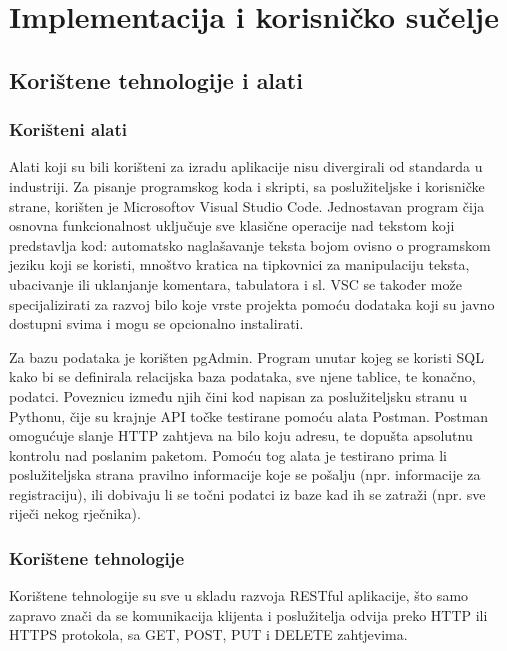 \chapter{Implementacija i korisničko sučelje}
		
		
		\section{Korištene tehnologije i alati}

             \subsection{Korišteni alati}
                \par    Alati koji su bili korišteni za izradu aplikacije nisu divergirali od standarda u industriji. Za pisanje
                programskog koda i skripti, sa poslužiteljske i korisničke strane, korišten je Microsoftov Visual Studio Code. 
                Jednostavan program čija osnovna funkcionalnost uključuje sve klasične operacije nad tekstom koji predstavlja kod:
                automatsko naglašavanje teksta bojom ovisno o programskom jeziku koji se koristi, mnoštvo kratica 
                na tipkovnici za manipulaciju teksta, ubacivanje ili uklanjanje komentara, tabulatora i sl. VSC se također može 
                specijalizirati za razvoj bilo koje vrste projekta pomoću dodataka koji su javno dostupni svima i mogu se 
                opcionalno instalirati.
                
                \par Za bazu podataka je korišten pgAdmin. Program unutar kojeg se koristi SQL kako bi se definirala relacijska baza
                podataka, sve njene tablice, te konačno, podatci. Poveznicu između njih čini kod napisan za poslužiteljsku stranu 
                u Pythonu, čije su krajnje API točke testirane pomoću alata Postman. Postman omogućuje slanje HTTP zahtjeva na 
                bilo koju adresu, te dopušta apsolutnu kontrolu nad poslanim paketom. Pomoću tog alata je testirano prima
                li poslužiteljska strana pravilno informacije koje se pošalju (npr. informacije za registraciju), ili dobivaju li
                se točni podatci iz baze kad ih se zatraži (npr. sve riječi nekog rječnika).

            \subsection{Korištene tehnologije}
                    Korištene tehnologije su sve u skladu razvoja RESTful aplikacije, što samo zapravo znači da se komunikacija
                klijenta i poslužitelja odvija preko HTTP ili HTTPS protokola, sa GET, POST, PUT i DELETE zahtjevima. 
                
